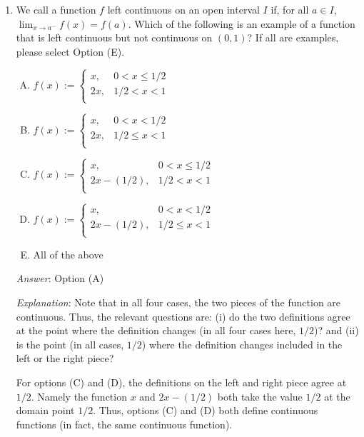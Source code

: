 \documentclass[10pt]{amsart}
\begin{document}
\begin{enumerate}

\item We call a function $f$ left continuous on an open interval $I$
  if, for all $a \in I$, $\displaystyle \lim_{x \to a^-} f(x) =
  f(a)$. Which of the following is an example of a function that is
  left continuous but not continuous on $(0,1)$? If all are examples,
  please select Option (E).

  \begin{enumerate}[(A)]
  \item $f(x) := \left \lbrace\begin{array}{rl}x, & 0 < x \le 1/2 \\ 2x, & 1/2 < x < 1 \\\end{array}\right.$
  \item $f(x) := \left \lbrace\begin{array}{rl}x, & 0 < x < 1/2 \\ 2x, & 1/2 \le x < 1 \\\end{array}\right.$
  \item $f(x) := \left \lbrace\begin{array}{rl}x, & 0 < x \le 1/2 \\ 2x - (1/2), & 1/2 < x < 1 \\\end{array}\right.$
  \item $f(x) := \left \lbrace\begin{array}{rl}x, & 0 < x < 1/2 \\ 2x - (1/2), & 1/2 \le x < 1 \\\end{array}\right.$
  \item All of the above
  \end{enumerate}

  {\em Answer}: Option (A)

  {\em Explanation}: Note that in all four cases, the two pieces of
  the function are continuous. Thus, the relevant questions are: (i) do
  the two definitions agree at the point where the definition changes
  (in all four cases here, $1/2$)? and (ii) is the point (in all cases,
  $1/2$) where the definition changes included in the left or the
  right piece?

  For options (C) and (D), the definitions on the left and right piece
  agree at $1/2$. Namely the function $x$ and $2x - (1/2)$ both take the
  value $1/2$ at the domain point $1/2$. Thus, options (C) and (D)
  both define continuous functions (in fact, the same continuous
  function).


\end{enumerate}
\end{document}
